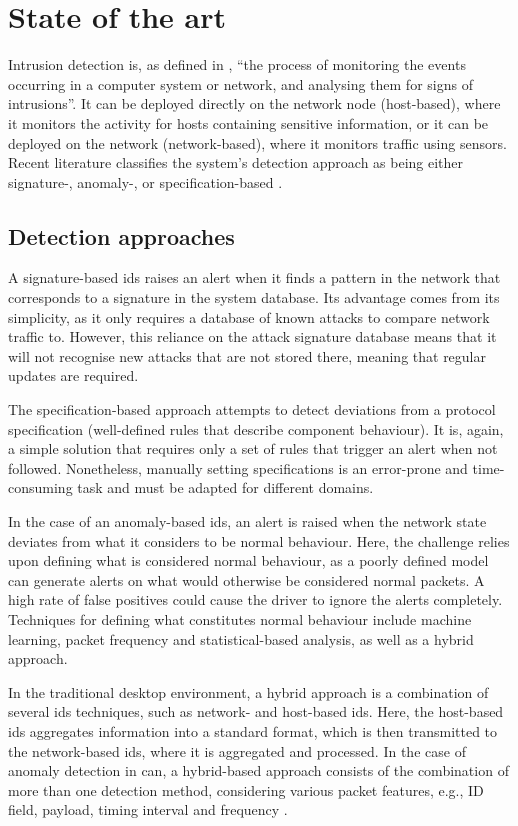 \chapter{State of the art}
\label{c:sota}

Intrusion detection is, as defined in \cite{Liao2013}, “the process of monitoring the events occurring in a computer system or network, and analysing them for signs of intrusions”. It can be deployed directly on the network node (host-based), where it monitors the activity for hosts containing sensitive information, or it can be deployed on the network (network-based), where it monitors traffic using sensors. Recent literature classifies the system’s detection approach as being either signature-, anomaly-, or specification-based \citep{Lokman2019}.

\section{Detection approaches}
\label{sec:ids_detection_approaches}

A signature-based \gls{ids} raises an alert when it finds a pattern in the network that corresponds to a signature in the system database. Its advantage comes from its simplicity, as it only requires a database of known attacks to compare network traffic to. However, this reliance on the attack signature database means that it will not recognise new attacks that are not stored there, meaning that regular updates are required.\par
The specification-based approach attempts to detect deviations from a protocol specification (well-defined rules that describe component behaviour). It is, again, a simple solution that requires only a set of rules that trigger an alert when not followed. Nonetheless, manually setting specifications is an error-prone and time-consuming task and must be adapted for different domains.\par
In the case of an anomaly-based \gls{ids}, an alert is raised when the network state deviates from what it considers to be normal behaviour. Here, the challenge relies upon defining what is considered normal behaviour, as a poorly defined model can generate alerts on what would otherwise be considered normal packets. A high rate of false positives could cause the driver to ignore the alerts completely. Techniques for defining what constitutes normal behaviour include machine learning, packet frequency and statistical-based analysis, as well as a hybrid approach.\par
In the traditional desktop environment, a hybrid approach is a combination of several \gls{ids} techniques, such as network- and host-based \gls{ids}. Here, the host-based \gls{ids} aggregates information into a standard format, which is then transmitted to the network-based \gls{ids}, where it is aggregated and processed. In the case of anomaly detection in \gls{can}, a hybrid-based approach consists of the combination of more than one detection method, considering various packet features, e.g., ID field, payload, timing interval and frequency \cite{Lokman2019}.

